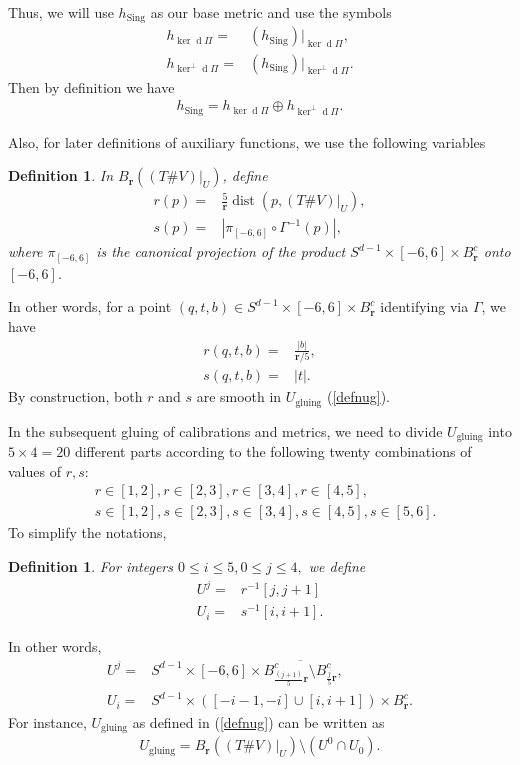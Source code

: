 \documentclass[11pt,a4paper]{amsart}
\numberwithin{equation}{section}
\newcommand{\sing}{{\operatorname{Sing}}}
\newcommand{\Ga}{\Gamma}
\newcommand{\ug}{U_{\operatorname{gluing}}}
\newcommand{\ov}[1]{\overline{#1}}
\newcommand{\ed}{{\operatorname{d}}}
\newcommand{\hkp}{h_{\ker \ed\Pi}}
\newcommand{\hkn}{h_{\ker^\perp \ed\Pi}}
\newcommand{\m}{^{-1}}
\newcommand{\mfr}{{\mathbf{r}}}
\newcommand{\tvu}{(T\#V)|_U}
\newcommand{\ur}{B_{\mfr}(\tvu)}
\theoremstyle{plain}
\newtheorem{defn}[exam]{Definition}
\theoremstyle{definition}
\numberwithin{equation}{subsection}
\begin{document}
	Thus, we will use $h_\sing$ as our base metric and use the symbols
	\begin{align*}
		h_{\ker \ed\Pi}=&(h_\sing)|_{\ker \ed\Pi}, \\h_{\ker^\perp \ed\Pi}=&(h_\sing)|_{\ker^\perp \ed\Pi}.
	\end{align*}
	Then by definition we have
	\begin{align*}
		h_\sing=\hkp \oplus \hkn.
	\end{align*}
	
	Also, for later definitions of auxiliary functions, we use the following variables
	\begin{defn}
		In $\ur$, define
		\begin{align*}
			r(p)=&\frac{5}{\mfr}\operatorname{dist}(p,\tvu),\\
			s(p)=&|\pi_{[-6,6]}\circ\Ga\m (p)|,
		\end{align*}
		where $\pi_{[-6,6]}$ is the canonical projection of the product $S^{d-1}\times[-6,6]\times B_\mfr^c$ onto $[-6,6]$.
	\end{defn}
	In other words, for a point $(q,t,b)\in S^{d-1}\times[-6,6]\times B_\mfr^c$ identifying via $\Ga$, we have
	\begin{align*}
		r(q,t,b)=&\frac{|b|}{\mfr/5},\\
		s(q,t,b)=&|t|.
	\end{align*}
	By construction, both $r$ and $s$ are smooth in $\ug$ (\ref{defnug}).
	
	In the subsequent gluing of calibrations and metrics, we need to divide $\ug$ into $5\times 4=20$ different parts according to the following twenty combinations of values of $r,s:$
	\begin{align*}
		&	r\in [1,2],r\in[2,3],r\in[3,4],r\in [4,5],\\
		&	s\in[1,2],s\in[2,3],s\in[3,4],s\in[4,5],s\in[5,6].
	\end{align*}
	To simplify the notations, 
	\begin{defn}\label{defnuij}
		For integers $0\le i\le 5,0\le j\le 4,$ we define
		\begin{align*}
			U^j=&r\m[j,j+1]\\
			U_i=&s\m[i,i+1].%
		\end{align*}
	\end{defn}
	In other words, 
	\begin{align*}
		U^j=&S^{d-1}\times [-6,6]\times \ov{B_{\frac{(j+1)}{5}\mfr}^c\setminus B_{\frac{j}{5}\mfr}^c},\\
		U_i=&	S^{d-1}\times ([-i-1,-i]\cup[i,i+1])\times B_{\mfr}^c.%
	\end{align*}
	\newcommand{\ua}{U_1}\newcommand{\ub}{U_2}\newcommand{\uc}{U_3}\newcommand{\ud}{U_4}
	For instance, $\ug$ as defined in (\ref{defnug}) can be written as
	\begin{align*}
		\ug=\ur\setminus(U^0\cap U_0).
	\end{align*}
\end{document}
